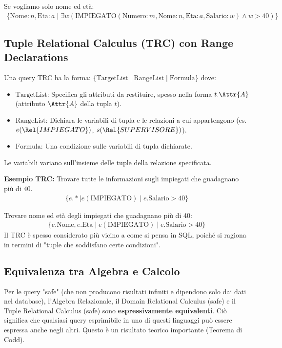 Se vogliamo solo nome ed età:
\begin{align*}
    \{ \text{Nome}:n, \text{Eta}:a \mid \exists w (\text{IMPIEGATO}(\text{Numero}:m, \text{Nome}:n, \text{Eta}:a, \text{Salario}:w) \land w > 40) \}
\end{align*}

\subsection{Tuple Relational Calculus (TRC) con Range Declarations}
Una query TRC ha la forma:
$\{ \text{TargetList} \mid \text{RangeList} \mid \text{Formula} \}$
dove:
\begin{itemize}
	\item $\text{TargetList}$: Specifica gli attributi da restituire, spesso nella forma $t.\Attr{A}$ (attributo $\Attr{A}$ della tupla $t$).
	\item $\text{RangeList}$: Dichiara le variabili di tupla e le relazioni a cui appartengono (es. $e(\Rel{IMPIEGATO})$, $s(\Rel{SUPERVISORE})$).
	\item $\text{Formula}$: Una condizione sulle variabili di tupla dichiarate.
\end{itemize}
Le variabili variano sull'insieme delle tuple della relazione specificata.

\textbf{Esempio TRC:} Trovare tutte le informazioni sugli impiegati che guadagnano più di 40.
\begin{align*}
    \{ e.* \mid e(\text{IMPIEGATO}) \mid e.\text{Salario} > 40 \}
\end{align*}

Trovare nome ed età degli impiegati che guadagnano più di 40:
\begin{align*}
    \{ e.\text{Nome}, e.\text{Eta} \mid e(\text{IMPIEGATO}) \mid e.\text{Salario} > 40 \}
\end{align*}
Il TRC è spesso considerato più vicino a come si pensa in SQL, poiché si ragiona in termini di "tuple che soddisfano certe condizioni".

\subsection{Equivalenza tra Algebra e Calcolo}
Per le query "safe" (che non producono risultati infiniti e dipendono solo dai dati nel database), l'Algebra Relazionale, il Domain Relational Calculus (safe) e il Tuple Relational Calculus (safe) sono \textbf{espressivamente equivalenti}. Ciò significa che qualsiasi query esprimibile in uno di questi linguaggi può essere espressa anche negli altri. Questo è un risultato teorico importante (Teorema di Codd).

